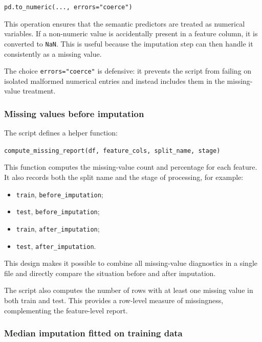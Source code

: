 \documentclass{ipgpmaster}
\begin{document}
\begin{center}
\texttt{pd.to\_numeric(..., errors="coerce")}
\end{center}

This operation ensures that the semantic predictors are treated as numerical variables. If a non-numeric value is accidentally present in a feature column, it is converted to \texttt{NaN}. This is useful because the imputation step can then handle it consistently as a missing value.

The choice \texttt{errors="coerce"} is defensive: it prevents the script from failing on isolated malformed numerical entries and instead includes them in the missing-value treatment.

\subsubsection{Missing values before imputation}

The script defines a helper function:

\begin{center}
\texttt{compute\_missing\_report(df, feature\_cols, split\_name, stage)}
\end{center}

This function computes the missing-value count and percentage for each feature. It also records both the split name and the stage of processing, for example:

\begin{itemize}
    \item \texttt{train}, \texttt{before\_imputation};
    \item \texttt{test}, \texttt{before\_imputation};
    \item \texttt{train}, \texttt{after\_imputation};
    \item \texttt{test}, \texttt{after\_imputation}.
\end{itemize}

This design makes it possible to combine all missing-value diagnostics in a single file and directly compare the situation before and after imputation.

The script also computes the number of rows with at least one missing value in both train and test. This provides a row-level measure of missingness, complementing the feature-level report.

\subsubsection{Median imputation fitted on training data}
\end{document}
